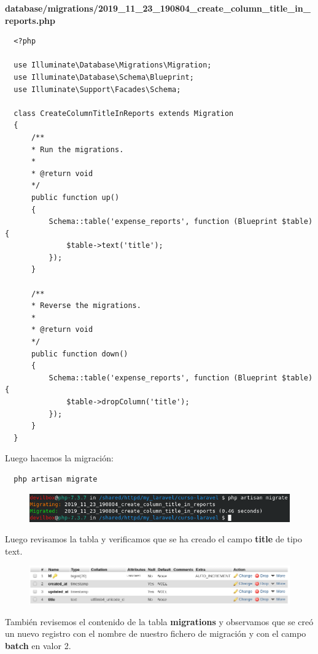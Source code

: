 \documentclass{article}
\begin{document}
\textbf{database/migrations/2019\_11\_23\_190804\_create\_column\_title\_in\_reports.php}
\begin{verbatim}
  <?php

  use Illuminate\Database\Migrations\Migration;
  use Illuminate\Database\Schema\Blueprint;
  use Illuminate\Support\Facades\Schema;

  class CreateColumnTitleInReports extends Migration
  {
      /**
      * Run the migrations.
      *
      * @return void
      */
      public function up()
      {
          Schema::table('expense_reports', function (Blueprint $table) {
              $table->text('title');
          });
      }

      /**
      * Reverse the migrations.
      *
      * @return void
      */
      public function down()
      {
          Schema::table('expense_reports', function (Blueprint $table) {
              $table->dropColumn('title');
          });
      }
  }
\end{verbatim}

\newpage

Luego hacemos la migración:
\begin{verbatim}
  php artisan migrate
\end{verbatim}

\begin{figure}[h!]
  \centering
  \includegraphics[scale=0.75]{./Pictures/041_migrate.png}
\end{figure}

Luego revisamos la tabla y verificamos que se ha creado el campo
\textbf{title} de tipo text.\\

\begin{figure}[h!]
  \centering
  \includegraphics[scale=0.65]{./Pictures/043_title.png}
\end{figure}

También revisemos el contenido de la tabla \textbf{migrations} y observamos que
se creó un nuevo registro con el nombre de nuestro fichero de migración y con
el campo \textbf{batch} en valor 2.\\
\end{document}
